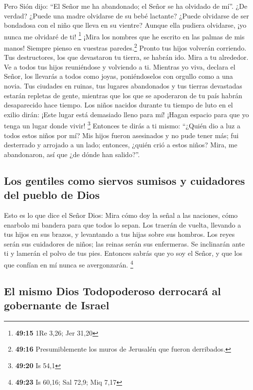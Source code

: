  Pero Sión dijo: ``El Señor me ha abandonado; el Señor se
ha olvidado de mí''.  ¿De verdad? ¿Puede una madre
olvidarse de su bebé lactante? ¿Puede olvidarse de ser bondadosa con el
niño que lleva en su vientre? Aunque ella pudiera olvidarse, ¡yo nunca
me olvidaré de ti! \footnote{\textbf{49:15} 1Re 3,26; Jer 31,20}
 ¡Mira los nombres que he escrito en las palmas de mis
manos! Siempre pienso en vuestras paredes.\footnote{\textbf{49:16}
  Presumiblemente los muros de Jerusalén que fueron derribados.}
 Pronto tus hijos volverán corriendo. Tus destructores,
los que devastaron tu tierra, se habrán ido.  Mira a tu
alrededor. Ve a todos tus hijos reuniéndose y volviendo a ti. Mientras
yo viva, declara el Señor, los llevarás a todos como joyas,
poniéndoselos con orgullo como a una novia.  Tus ciudades
en ruinas, tus lugares abandonados y tus tierras devastadas estarán
repletas de gente, mientras que los que se apoderaron de tu país habrán
desaparecido hace tiempo.  Los niños nacidos durante tu
tiempo de luto en el exilio dirán: ¡Este lugar está demasiado lleno para
mí! ¡Hagan espacio para que yo tenga un lugar donde vivir! \footnote{\textbf{49:20}
  Is 54,1}  Entonces te dirás a ti mismo: ``¿Quién dio a
luz a todos estos niños por mí? Mis hijos fueron asesinados y no pude
tener más; fui desterrado y arrojado a un lado; entonces, ¿quién crió a
estos niños? Mira, me abandonaron, así que ¿de dónde han salido?''.

\hypertarget{los-gentiles-como-siervos-sumisos-y-cuidadores-del-pueblo-de-dios}{%
\subsection{Los gentiles como siervos sumisos y cuidadores del pueblo de
Dios}\label{los-gentiles-como-siervos-sumisos-y-cuidadores-del-pueblo-de-dios}}

 Esto es lo que dice el Señor Dios: Mira cómo doy la
señal a las naciones, cómo enarbolo mi bandera para que todos lo sepan.
Los traerán de vuelta, llevando a tus hijos en sus brazos, y levantando
a tus hijas sobre sus hombros.  Los reyes serán sus
cuidadores de niños; las reinas serán sus enfermeras. Se inclinarán ante
ti y lamerán el polvo de tus pies. Entonces sabrás que yo soy el Señor,
y que los que confían en mí nunca se avergonzarán. \footnote{\textbf{49:23}
  Is 60,16; Sal 72,9; Miq 7,17}

\hypertarget{el-mismo-dios-todopoderoso-derrocaruxe1-al-gobernante-de-israel}{%
\subsection{El mismo Dios Todopoderoso derrocará al gobernante de
Israel}\label{el-mismo-dios-todopoderoso-derrocaruxe1-al-gobernante-de-israel}}


